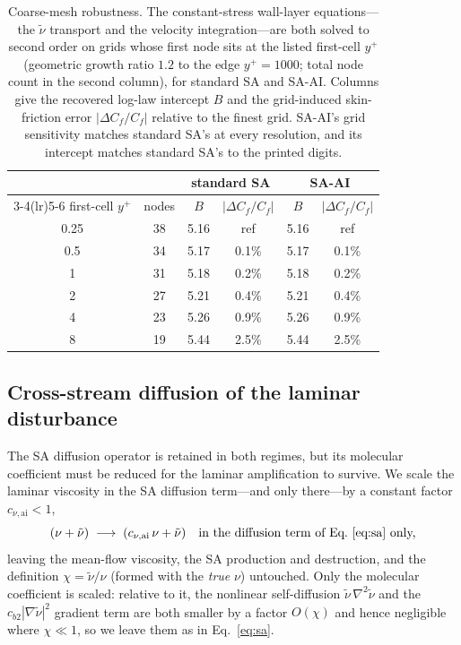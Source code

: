 \documentclass[journal]{new-aiaa}
\begin{document}
\begin{table}[tp]
  \centering
  \small
  \caption{Coarse-mesh robustness. The constant-stress wall-layer equations---the
  $\tilde\nu$ transport and the velocity integration---are both solved to second
  order on grids whose first node sits at the listed first-cell $y^+$ (geometric
  growth ratio $1.2$ to the edge $y^+\!=\!1000$; total node count in the second
  column), for standard SA and SA-AI. Columns give the recovered log-law intercept $B$ and the grid-induced
  skin-friction error $|\Delta C_f/C_f|$ relative to the finest grid. SA-AI's grid
  sensitivity matches standard SA's at every resolution, and its intercept
  matches standard SA's to the printed digits.}
  \label{tab:yplus}
  \begin{tabular}{cc cc cc}
    \toprule
    & & \multicolumn{2}{c}{standard SA} & \multicolumn{2}{c}{SA-AI}\\
    \cmidrule(lr){3-4}\cmidrule(lr){5-6}
    first-cell $y^+$ & nodes & $B$ & $|\Delta C_f/C_f|$ & $B$ & $|\Delta C_f/C_f|$\\
    \midrule
    0.25 & 38 & 5.16 & ref    & 5.16 & ref \\
    0.5  & 34 & 5.17 & 0.1\%  & 5.17 & 0.1\% \\
    1    & 31 & 5.18 & 0.2\%  & 5.18 & 0.2\% \\
    2    & 27 & 5.21 & 0.4\%  & 5.21 & 0.4\% \\
    4    & 23 & 5.26 & 0.9\%  & 5.26 & 0.9\% \\
    8    & 19 & 5.44 & 2.5\%  & 5.44 & 2.5\% \\
    \bottomrule
  \end{tabular}
\end{table}


\subsection{Cross-stream diffusion of the laminar disturbance}\label{sec:nulamscale}
The SA diffusion operator is retained in both regimes, but its molecular
coefficient must be reduced for the laminar amplification to survive. We scale
the laminar viscosity in the SA diffusion term---and only there---by a constant
factor $c_{\nu,\mathrm{ai}}\!<\!1$,
\begin{equation}
  (\nu+\tilde\nu)\;\longrightarrow\;(c_{\nu,\mathrm{ai}}\,\nu+\tilde\nu)
  \quad\text{in the diffusion term of Eq.~\eqref{eq:sa} only,}
  \label{eq:nulamscale}
\end{equation}
leaving the mean-flow viscosity, the SA production and destruction, and the
definition $\chi=\tilde\nu/\nu$ (formed with the \emph{true} $\nu$) untouched.
Only the molecular coefficient is scaled: relative to it, the nonlinear
self-diffusion $\tilde\nu\,\nabla^2\tilde\nu$ and the $c_{b2}|\nabla\tilde\nu|^2$
gradient term are both smaller by a factor $O(\chi)$ and hence
negligible where $\chi\!\ll\!1$, so we leave them as in Eq.~\eqref{eq:sa}.
\end{document}
